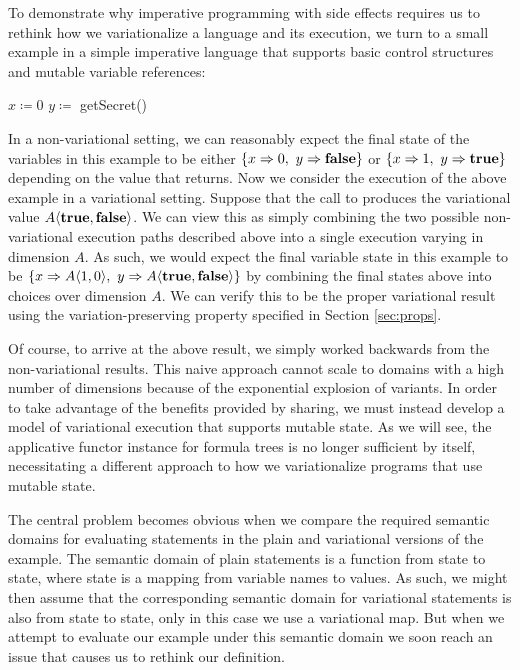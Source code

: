\documentclass[12pt,oneside]{book}
\newcommand{\tagtree}[3]{#1 \langle #2, #3 \rangle}
\begin{document}
To demonstrate why imperative programming with side effects requires us to rethink how we
variationalize a language and its execution, we turn to a small example in a simple imperative
language that supports basic control structures and mutable variable references:

\begin{samepage}
\begin{algorithmic}
\STATE $x \coloneqq 0$
\STATE $y \coloneqq$ getSecret()
\ENDIF
\end{algorithmic}
\end{samepage}

In a non-variational setting, we can reasonably expect the final state of the variables in this example
to be either $\{x \Rightarrow 0,\ y \Rightarrow \textbf{\textup{\textrm{false}}}\}$ or
$\{x \Rightarrow 1,\ y \Rightarrow \textbf{\textup{\textrm{true}}}\}$ depending on the value that
 returns. Now we consider the execution of the above example in a variational
setting. Suppose that the call to 
produces the variational value $\tagtree{A}{\CCkeyw{true}}{\CCkeyw{false}}$. We can view this as simply
combining the two possible non-variational execution paths described above into a
single execution varying in dimension $A$. As such, we would expect the final variable state
in this example to be  $\{x \Rightarrow \tagtree{A}{1}{0},\ y \Rightarrow \tagtree{A}{\CCkeyw{true}}{\CCkeyw{false}}\}$ by combining the final states above into choices over dimension $A$. We can verify this to be the proper variational result using the variation-preserving property
specified in Section \ref{sec:props}.

Of course, to arrive at the above result, we simply worked backwards from the non-variational
results. This naive approach cannot scale to domains with a high number of dimensions because of the exponential
explosion of variants. In order to take advantage of the benefits provided by sharing, we must instead develop a model
of variational execution that supports mutable state.  As we will see, the applicative functor instance for
formula trees is no longer sufficient by itself, necessitating a different approach to how we variationalize programs
that use mutable state.

The central problem becomes obvious when we compare the required semantic domains for evaluating statements
in the plain and variational versions of the example. The semantic domain of plain statements is a function from state to
state, where state is a mapping from variable names to values. As such, we might then assume that the corresponding
semantic domain for variational statements is also from state to state, only in this case we use a variational map. But when
we attempt to evaluate our example under this semantic domain we soon reach an issue that causes us to rethink our definition.
\end{document}
